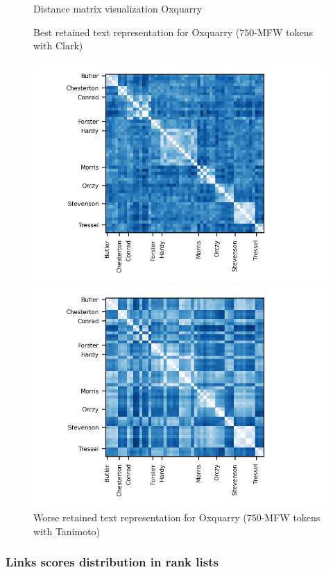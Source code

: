\begin{figure}
  \caption{Distance matrix visualization Oxquarry}
  \label{fig:distances_matrix_oxquarry}

  \caption{Best retained text representation for Oxquarry ($750$-MFW tokens with Clark)}
  \label{fig:distance_matrix_oxquarry_clark}
  \includegraphics{img/distance_matrix_oxquarry_clark.png}

  \caption{Worse retained text representation for Oxquarry ($750$-MFW tokens with Tanimoto)}
  \label{fig:distance_matrix_oxquarry_tanimoto}
  \includegraphics{img/distance_matrix_oxquarry_tanimoto.png}
\end{figure}

\subsubsection{Links scores distribution in rank lists}

